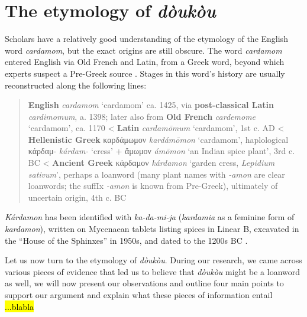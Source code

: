 \documentclass[12pt]{article}
\newcommand{\lb}[1]{\linearbfont{#1}\rmfamily}
\begin{document}
\section{The etymology of \textit{dòukòu}}\label{sec:etymology}

Scholars have a relatively good understanding of the etymology of the English word \textit{cardamom}, but the exact origins are still obscure. The word \textit{cardamom} entered English via Old French and Latin, from a Greek word, beyond which experts suspect a Pre-Greek source \parencite{beekes_2010_etymological}. Stages in this word's history are usually reconstructed along the following lines:

\begin{quote}
    \textbf{English} \textit{cardamom} `cardamom' ca. 1425, via \textbf{post-classical Latin} \textit{cardimomum}, a. 1398; 
    later also from \textbf{Old French} \textit{cardemome} `cardamom', ca. 1170
    < \textbf{Latin} \textit{cardamōmum} `cardamom', 1st c. AD
    < \textbf{Hellenistic Greek} {καρδάμωμον} \textit{kardámōmon} `cardamom', haplological κάρδαμ- \textit{kárdam-} `cress' + ἄμωμον \textit{ámōmon} `an Indian spice plant', 3rd c. BC
    < \textbf{Ancient Greek} {κάρδαμον} \textit{kárdamon} `garden cress, \textit{Lepidium sativum}', perhaps a loanword (many plant names with \textit{-amon} are clear loanwords; the suffIx \textit{-amon} is known from Pre-Greek), ultimately of uncertain origin, 4th c. BC 
    \parencites[s.v. cardamom]{oed}[s.v. cardamome]{tlfi}[s.v. cardamomum]{lewis_1879_latin}[s.v. καρδάμωμον]{liddell_1940_greekenglish}[s.v. κάρδαμον]{liddell_1940_greekenglish}[644]{beekes_2010_etymological}
\end{quote}

\textit{Kárdamon} has been identified with \lb{𐀏𐀅𐀖𐀊} \textit{ka-da-mi-ja} (\textit{kardamia} as a feminine form of \textit{kardamon}), written on Mycenaean tablets listing spices in Linear B, excavated in the ``House of the Sphinxes'' in 1950s, and dated to the 1200s BC \parencite[107]{bennett_1958_mycenae}.


Let us now turn to the etymology of \textit{dòukòu}. During our research, we came across various pieces of evidence that led us to believe that \textit{dòukòu} might be a loanword as well, we will now present our observations and outline four main points to support our argument and explain what these pieces of information entail \hl{...blabla}
\end{document}
